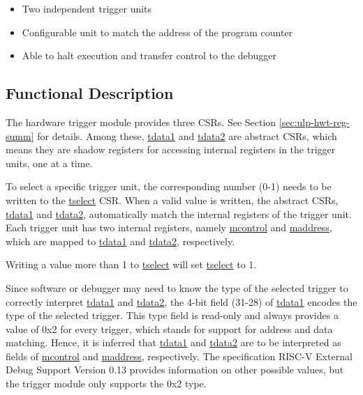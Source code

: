 \documentclass[main\_\_EN.tex]{subfiles}
\begin{document}
\begin{itemize}
    \item Two independent trigger units
    \item Configurable unit to match the address of the program counter
    \item Able to halt execution and transfer control to the debugger

\end{itemize}

\subsection{Functional Description}
\label{sec:ulp-hwt-func-descr}

The hardware trigger module provides three CSRs. See Section \ref{sec:ulp-hwt-reg-summ} for details. Among these, \hyperref[regdesc:LPTDATA1]{tdata1} and \hyperref[regdesc:LPTDATA2]{tdata2} are abstract CSRs, which means they are shadow registers for accessing internal registers in the trigger units, one at a time.

To select a specific trigger unit, the corresponding number (0-1) needs to be written to the \hyperref[regdesc:LPTSELECT]{tselect} CSR. When a valid value is written, the abstract CSRs, \hyperref[regdesc:LPTDATA1]{tdata1} and \hyperref[regdesc:LPTDATA2]{tdata2}, automatically match the internal registers of the trigger unit. Each trigger unit has two internal registers, namely \hyperref[regdesc:LPMCONTROL]{mcontrol} and \hyperref[regdesc:LPMADDRESS]{maddress}, which are mapped to \hyperref[regdesc:LPTDATA1]{tdata1} and \hyperref[regdesc:LPTDATA2]{tdata2}, respectively.

Writing a value more than 1 to \hyperref[regdesc:LPTSELECT]{tselect} will set \hyperref[regdesc:LPTSELECT]{tselect} to 1.

Since software or debugger may need to know the type of the selected trigger to correctly interpret \hyperref[regdesc:LPTDATA1]{tdata1} and \hyperref[regdesc:LPTDATA2]{tdata2}, the 4-bit field (31-28) of \hyperref[regdesc:LPTDATA1]{tdata1} encodes the type of the selected trigger. This type field is read-only and always provides a value of 0x2 for every trigger, which stands for support for address and data matching. Hence, it is inferred that \hyperref[regdesc:LPTDATA1]{tdata1} and \hyperref[regdesc:LPTDATA2]{tdata2} are to be interpreted as fields of \hyperref[regdesc:LPMCONTROL]{mcontrol} and \hyperref[regdesc:LPMADDRESS]{maddress}, respectively. The specification RISC-V External Debug Support Version 0.13 provides information on other possible values, but the trigger module only supports the 0x2 type.
\end{document}
